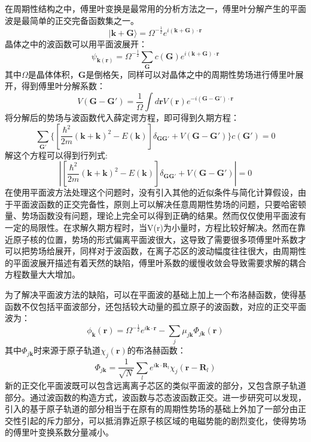 在周期性结构之中，傅里叶变换是最常用的分析方法之一，傅里叶分解产生的平面波是最简单的正交完备函数集之一。
\begin{equation}
    |\bm{k}+\bm{G}\rangle =\Omega^{-\frac{1}{2}} e^{i(\bm{k}+\bm{G})\cdot\bm{r}}
\end{equation}
晶体之中的波函数可以用平面波展开：
\begin{equation}
    \psi_{\bm{k}(\bm{r})}=\Omega^{-\frac{1}{2}}\sum_{\bm{G}}c(\bm{G})e^{i(\bm{k}+\bm{G})\cdot\bm{r}}
\end{equation}
其中$\Omega$是晶体体积，$\bm{G}$是倒格矢，同样可以对晶体之中的周期性势场进行傅里叶展开，得到傅里叶分解系数：
\begin{equation}
    V(\bm{G}-\bm{G'})=\frac{1}{\Omega}\int d\bm{r}V(\bm{r})e^{-i(\bm{G}-\bm{G'})\cdot\bm{r}}
\end{equation}
将分解后的势场与波函数代入薛定谔方程，即可得到久期方程：
\begin{equation}
    \sum_{\bm{G'}}\{ [\frac{\hbar^{2}}{2m}(\bm{k}+\bm{k})^{2}-E(\bm{k})]\delta_{\bm{G}\bm{G'}}+V(\bm{G}-\bm{G'}) \}c(\bm{G'})=0
\end{equation} 
解这个方程可以得到行列式:
\begin{equation}
    |[\frac{\hbar^{2}}{2m}(\bm{k}+\bm{k})^{2}-E(\bm{k})]\delta_{\bm{G}\bm{G'}}+V(\bm{G}-\bm{G'})|=0
\end{equation}
在使用平面波方法处理这个问题时，没有引入其他的近似条件与简化计算假设，由于平面波函数的正交完备性，原则上可以解决任意周期性势场的问题，只要哈密顿量、势场函数没有问题，理论上完全可以得到正确的结果。然而仅仅使用平面波有一定的局限性。在求解久期方程时，当V(r)为小量时，方程比较好解决。然而在靠近原子核的位置，势场的形式偏离平面波很大，这导致了需要很多项傅里叶系数才可以把势场给展开，同样对于波函数，在离子芯区的波动幅度往往很大，由周期性的平面波展开描述有着天然的缺陷，傅里叶系数的缓慢收敛会导致需要求解的耦合方程数量大大增加。

为了解决平面波方法的缺陷，可以在平面波的基础上加上一个布洛赫函数，使得基函数不仅包括平面波部分，还包括较大动量的孤立原子的波函数，对应的正交平面波为：
\begin{equation}
    \phi_{\bm{k}}(\bm{r})=\Omega^{-\frac{1}{2}}e^{i\bm{k}\cdot\bm{r}}-\sum_{j}\mu_{j\bm{k}}\Phi_{j\bm{k}}(\bm{r})
\end{equation}
其中$\Phi_{j\bm{k}}$时来源于原子轨道$\chi_{j}(\bm{r})$的布洛赫函数：
\begin{equation}
    \Phi_{j\bm{k}}=\frac{1}{\sqrt{N}}\sum_{l}e^{i\bm{k}\cdot\bm{R}_{l}}\chi_{j}(\bm{r}-\bm{R}_{l})
\end{equation}
新的正交化平面波既可以包含远离离子芯区的类似平面波的部分，又包含原子轨道部分。通过波函数的构造方式，波函数与芯态波函数正交。进一步研究可以发现，引入的基于原子轨道的部分相当于在原有的周期性势场的基础上外加了一部分由正交性引起的斥力部分，可以抵消靠近原子核区域的电磁势能的剧烈变化，使得势场的傅里叶变换系数分量减小。

